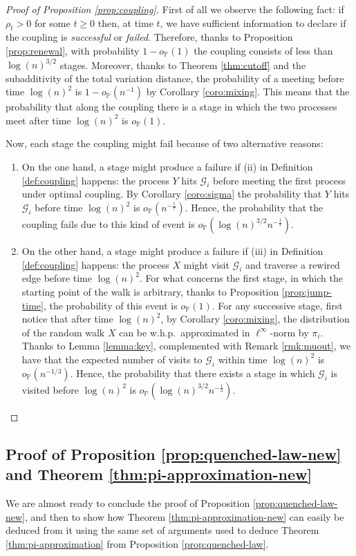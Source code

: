 \documentclass[11pt,oneside]{amsart}
\numberwithin{equation}{section}  %
\theoremstyle{plain}
\newcommand{\whp}{{w.h.p.~}}
\newcommand{\p}{\mathbb{P}}
\newcommand{\op}{o_{\p}}
\newcommand{\gates}{\mathcal{G}}
\begin{document}
\begin{proof}[Proof of Proposition \ref{prop:coupling}]
	First of all we observe the following fact: if $\rho_t>0$ for some $t\ge0$ then, at time $t$, we have sufficient information to declare if the coupling is \emph{successful} or \emph{failed}. Therefore, thanks to Proposition \ref{prop:renewal}, with probability $1-\op(1)$  the coupling consists of less than $\log(n)^{3/2}$ stages. Moreover, thanks to Theorem \ref{thm:cutoff} and the subadditivity of the total variation distance, the probability of a meeting before time $\log(n)^2$ is $1-\op(n^{-1})$ by Corollary \ref{coro:mixing}. This means that the probability that along the coupling there is a stage in which the two processes meet after time $\log(n)^2$ is $\op(1)$.
	
	Now, each stage the coupling might fail because of two alternative reasons:
	\begin{enumerate}
		\item 
        On the one hand, a stage might produce a failure if (ii) in Definition \ref{def:coupling} happens: the process $Y$ hits $\gates_i$ before meeting the first process under optimal coupling. By Corollary \ref{coro:sigma} the probability that $Y$ hits $\gates_i$ before time $\log(n)^2$ is $\op (n^{-\frac17})$. 
        Hence, the probability that the coupling fails due to this kind of event is $\op (\log(n)^{3/2}n^{-\frac17})$.
		\item 
        On the other hand, a stage might produce a failure if (iii) in Definition \ref{def:coupling} happens: the process $X$ might visit $\gates_i$ and traverse a rewired edge before time $\log(n)^2$.
         For what concerns the first stage, in which the starting point of the walk is arbitrary, thanks to Proposition \ref{prop:jump-time}, the probability of this event is $\op(1)$. 
For any successive stage, first notice that after time $\log(n)^2$, by Corollary \ref{coro:mixing}, the distribution of the random walk $X$ can be \whp approximated in $\ell^\infty$-norm by $\pi_i$. 
        Thanks to Lemma \ref{lemma:key}, complemented with Remark \ref{rmk:muout}, we have that the expected number of visits to $\gates_i$ within time $\log(n)^2$ is $o_{\p}(n^{-1/3})$. 
		Hence, the probability that there exists a stage in which $\gates_i$ is visited before $\log(n)^2$ is $o_{\p}(\log(n)^{3/2}n^{-\frac13})$.
	\end{enumerate}
\end{proof}

\subsection{Proof of Proposition \ref{prop:quenched-law-new} and Theorem \ref{thm:pi-approximation-new}}\label{suse:proof-prop-thm}
We are almost ready to conclude the proof of Proposition \ref{prop:quenched-law-new}, and then to show how Theorem \ref{thm:pi-approximation-new} 
can easily be deduced from it using the same set of arguments used to deduce Theorem \ref{thm:pi-approximation} from Proposition \ref{prop:quenched-law}.
\end{document}
